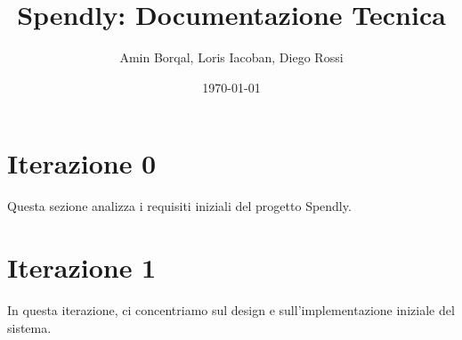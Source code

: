 \documentclass{softwaredoc}
\title{Spendly: Documentazione Tecnica}
\author{Amin Borqal, Loris Iacoban, Diego Rossi}
\date{\today}
\begin{document}
\maketitle
\newpage %
\thispagestyle{empty} %
\mbox{} %
\newpage 

\tableofcontents
{} %
\newpage
\listoffigures
\listoftables
\newpage 
\section*{Iterazione 0}
Questa sezione analizza i requisiti iniziali del progetto Spendly.


\newpage

\newpage



\newpage

\newpage



\newpage
\section*{Iterazione 1}
In questa iterazione, ci concentriamo sul design e sull'implementazione iniziale del sistema.


\newpage

\newpage

\end{document}
